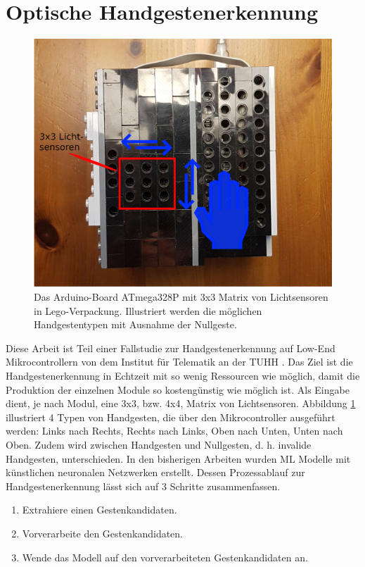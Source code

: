 \section{Optische Handgestenerkennung}
\label{sec:fallstudie}
\begin{figure}
    \centering
    \includegraphics[width=0.6\linewidth]{images/arduino_ex.png}
    \caption{Das Arduino-Board ATmega328P mit 3x3 Matrix von Lichtsensoren in Lego-Verpackung. Illustriert werden die möglichen Handgestentypen mit Ausnahme der Nullgeste.}
    \label{fig:arduino_ex}
\end{figure}
Diese Arbeit ist Teil einer Fallstudie zur Handgestenerkennung auf Low-End Mikrocontrollern von dem Institut für Telematik an der TUHH \cite{venzkeArticle}. Das Ziel ist die Handgestenerkennung in Echtzeit mit so wenig
Ressourcen wie möglich, damit die Produktion der einzelnen Module so kostengünstig wie möglich ist. Als Eingabe dient, je nach Modul, eine 3x3, bzw. 4x4, Matrix von Lichtsensoren. Abbildung \ref{fig:arduino_ex}
illustriert 4 Typen von Handgesten, die über den Mikrocontroller ausgeführt werden: Links nach Rechts, Rechts nach Links, Oben nach Unten, Unten nach Oben. Zudem wird zwischen Handgesten und Nullgesten, d. h.
invalide Handgesten, unterschieden. In den bisherigen Arbeiten wurden ML Modelle mit künstlichen neuronalen Netzwerken erstellt. Dessen Prozessablauf zur Handgestenerkennung lässt sich auf 3
Schritte zusammenfassen.
\begin{enumerate}
    \item Extrahiere einen Gestenkandidaten.
    \item Vorverarbeite den Gestenkandidaten.
    \item Wende das Modell auf den vorverarbeiteten Gestenkandidaten an.
\end{enumerate}





